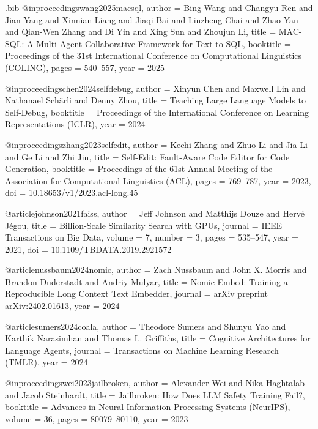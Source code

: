 \begin{filecontents*}{\jobname.bib}
@inproceedings{wang2025macsql,
  author    = {Bing Wang and Changyu Ren and Jian Yang and Xinnian Liang and Jiaqi Bai and Linzheng Chai and Zhao Yan and Qian-Wen Zhang and Di Yin and Xing Sun and Zhoujun Li},
  title     = {{MAC-SQL}: A Multi-Agent Collaborative Framework for Text-to-{SQL}},
  booktitle = {Proceedings of the 31st International Conference on Computational Linguistics (COLING)},
  pages     = {540--557},
  year      = {2025}
}

@inproceedings{chen2024selfdebug,
  author    = {Xinyun Chen and Maxwell Lin and Nathanael Sch{\"a}rli and Denny Zhou},
  title     = {Teaching Large Language Models to Self-Debug},
  booktitle = {Proceedings of the International Conference on Learning Representations (ICLR)},
  year      = {2024}
}

@inproceedings{zhang2023selfedit,
  author    = {Kechi Zhang and Zhuo Li and Jia Li and Ge Li and Zhi Jin},
  title     = {Self-Edit: Fault-Aware Code Editor for Code Generation},
  booktitle = {Proceedings of the 61st Annual Meeting of the Association for Computational Linguistics (ACL)},
  pages     = {769--787},
  year      = {2023},
  doi       = {10.18653/v1/2023.acl-long.45}
}

@article{johnson2021faiss,
  author    = {Jeff Johnson and Matthijs Douze and Herv{\'e} J{\'e}gou},
  title     = {Billion-Scale Similarity Search with {GPUs}},
  journal   = {IEEE Transactions on Big Data},
  volume    = {7},
  number    = {3},
  pages     = {535--547},
  year      = {2021},
  doi       = {10.1109/TBDATA.2019.2921572}
}

@article{nussbaum2024nomic,
  author    = {Zach Nussbaum and John X. Morris and Brandon Duderstadt and Andriy Mulyar},
  title     = {Nomic Embed: Training a Reproducible Long Context Text Embedder},
  journal   = {arXiv preprint arXiv:2402.01613},
  year      = {2024}
}

@article{sumers2024coala,
  author    = {Theodore Sumers and Shunyu Yao and Karthik Narasimhan and Thomas L. Griffiths},
  title     = {Cognitive Architectures for Language Agents},
  journal   = {Transactions on Machine Learning Research (TMLR)},
  year      = {2024}
}

@inproceedings{wei2023jailbroken,
  author    = {Alexander Wei and Nika Haghtalab and Jacob Steinhardt},
  title     = {Jailbroken: How Does {LLM} Safety Training Fail?},
  booktitle = {Advances in Neural Information Processing Systems (NeurIPS)},
  volume    = {36},
  pages     = {80079--80110},
  year      = {2023}
}


\end{filecontents*}
